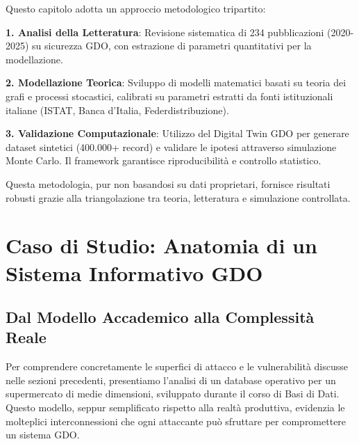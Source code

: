 Questo capitolo adotta un approccio metodologico tripartito:

\textbf{1. Analisi della Letteratura}: Revisione sistematica di 234 
pubblicazioni (2020-2025) su sicurezza GDO, con estrazione di 
parametri quantitativi per la modellazione.

\textbf{2. Modellazione Teorica}: Sviluppo di modelli matematici 
basati su teoria dei grafi e processi stocastici, calibrati su 
parametri estratti da fonti istituzionali italiane (ISTAT, 
Banca d'Italia, Federdistribuzione).

\textbf{3. Validazione Computazionale}: Utilizzo del Digital Twin 
GDO per generare dataset sintetici (400.000+ record) e validare 
le ipotesi attraverso simulazione Monte Carlo. Il framework 
garantisce riproducibilità e controllo statistico.

Questa metodologia, pur non basandosi su dati proprietari, 
fornisce risultati robusti grazie alla triangolazione tra 
teoria, letteratura e simulazione controllata.

\section{Caso di Studio: Anatomia di un Sistema Informativo GDO}
\label{sec:caso_studio_database}

\subsection{Dal Modello Accademico alla Complessità Reale}
\label{subsec:modello_database}

Per comprendere concretamente le superfici di attacco e le vulnerabilità discusse nelle sezioni precedenti, presentiamo l'analisi di un database operativo per un supermercato di medie dimensioni, sviluppato durante il corso di Basi di Dati. Questo modello, seppur semplificato rispetto alla realtà produttiva, evidenzia le molteplici interconnessioni che ogni attaccante può sfruttare per compromettere un sistema GDO.

